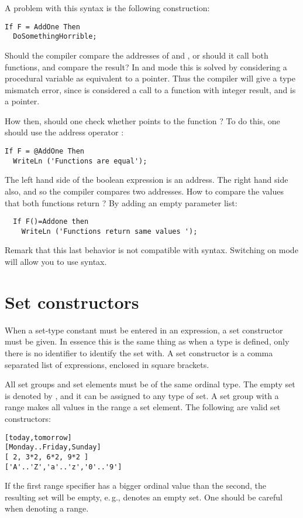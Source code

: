 A problem with this syntax is the following construction:
\begin{verbatim}
If F = AddOne Then
  DoSomethingHorrible;
\end{verbatim}
Should the compiler compare the addresses of  and ,
or should it call both functions, and compare the result? In  and
 mode this is solved by considering a procedural variable as
equivalent to a pointer. Thus the compiler will give a type mismatch error,
since  is considered a call to a function with integer result,
and  is a pointer.

How then, should one check whether  points to the function
? To do this, one should use the address operator :
\begin{verbatim}
If F = @AddOne Then
  WriteLn ('Functions are equal');
\end{verbatim}
The left hand side of the boolean expression is an address. The right hand
side also, and so the compiler compares two addresses.
How to compare the values that both functions return ? By adding an empty
parameter list:
\begin{verbatim}
  If F()=Addone then
    WriteLn ('Functions return same values ');
\end{verbatim}
Remark that this last behavior is not compatible with \delphi syntax.
Switching on  mode will allow you to use \delphi syntax.

\section{Set constructors}
When a set-type constant must be entered in an expression, a
set constructor must be given. In essence this is the same thing as when a
type is defined, only there is no identifier to identify the set with.
A set constructor is a comma separated list of expressions, enclosed in
square brackets.

All set groups and set elements must be of the same ordinal type.
The empty set is denoted by \var{[]}, and it can be assigned to any type of
set. A set group with a range  \var{[A..Z]} makes all values in the range a
set element.
The following are valid set constructors:
\begin{verbatim}
[today,tomorrow]
[Monday..Friday,Sunday]
[ 2, 3*2, 6*2, 9*2 ]
['A'..'Z','a'..'z','0'..'9']
\end{verbatim}
\begin{remark}
If the first range specifier has a bigger ordinal value than
the second, the resulting set will be empty, e.\,g., \var{['Z'..'A']}
denotes an empty set. One should be careful when denoting a range.
\end{remark}

